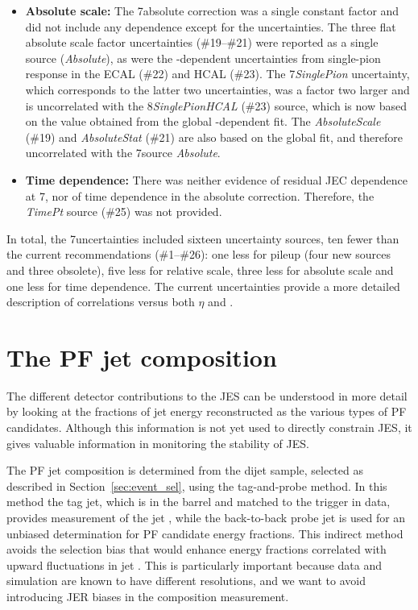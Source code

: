 \documentclass[11pt,twoside,a4paper,cmspaper,final,collab]{cms-tdr}
\begin{document}
\begin{itemize}
\item \textbf{Absolute scale:} The 7\TeV absolute correction was a single constant factor and did not include any \pt dependence except for the uncertainties. The three flat absolute scale factor uncertainties (\#19--\#21) were reported as a single source (\textit{Absolute}), as were the \pt-dependent uncertainties from single-pion response in the ECAL (\#22) and HCAL (\#23). The 7\TeV \textit{SinglePion} uncertainty, which corresponds to the latter two uncertainties, was a factor two larger and is uncorrelated with the 8\TeV \textit{Single\-Pion\-HCAL} (\#23) source, which is now based on the value obtained from the global \pt-dependent fit. The \textit{AbsoluteScale} (\#19) and \textit{AbsoluteStat} (\#21) are also based on the global fit, and therefore uncorrelated with the 7\TeV source \textit{Absolute}.

\item \textbf{Time dependence:} There was neither evidence of residual JEC \pt dependence at 7\TeV, nor of time dependence in the absolute correction. Therefore, the \textit{TimePt} source (\#25) was not provided.
\end{itemize}

In total, the 7\TeV uncertainties included sixteen uncertainty sources, ten fewer than the current recommendations (\#1--\#26): one less for pileup (four new sources and three obsolete), five less for relative scale, three less for absolute scale and one less for time dependence. The current uncertainties provide a more detailed description of correlations versus both $\eta$ and \pt.

\section{The PF jet composition}
\label{sec:jetcomp}

The different detector contributions to the JES can be understood in more detail by looking at the fractions of jet energy reconstructed as the various types of PF candidates. Although this information is not yet used to directly constrain JES, it gives valuable information in monitoring the stability of JES.

The PF jet composition is determined from the dijet sample, selected as described in Section~\ref{sec:event_sel}, using the tag-and-probe method. In this method the tag jet, which is in the barrel and matched to the trigger in data, provides measurement of the jet \pt, while the back-to-back probe jet is used for an unbiased determination for PF candidate energy fractions. This indirect method avoids the selection bias that would enhance energy fractions correlated with upward fluctuations in jet \pt. This is particularly important because data and simulation are known to have different resolutions, and we want to avoid introducing JER biases in the composition measurement.
\end{document}
